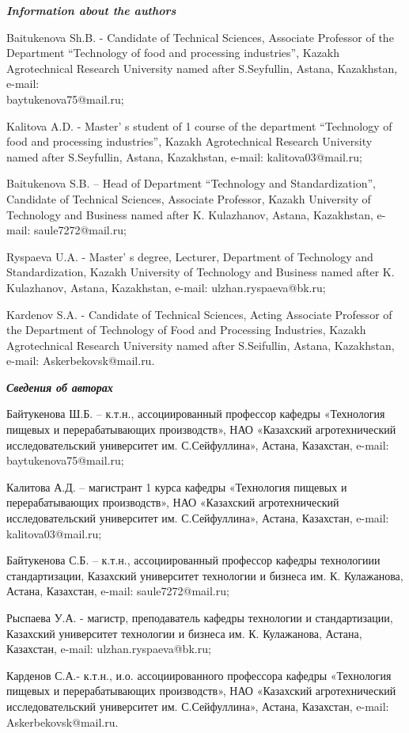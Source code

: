\begin{authorinfo}
\emph{{\bfseries Information about the authors}}

Baitukenova Sh.B. - Candidate of Technical Sciences, Associate Professor
of the Department ``Technology of food and process\-ing industries'',
Kazakh Agrotechnical Research University named after S.Seyfullin,
Astana, Kazakhstan, e-mail: \\baytukenova75@mail.ru;

Kalitova A.D. - Master' s student of 1 course of the
department ``Technology of food and processing industries'', Kazakh
Agrotechnical Research University named after S.Seyfullin, Astana,
Kazakhstan, e-mail: kalitova03@mail.ru;

Baitukenova S.B. -- Head of Department ``Technology and
Standardization'', Candidate of Technical Sciences, Associate Profes\-sor,
Kazakh University of Technology and Business named after K. Kulazhanov,
Astana, Kazakhstan, e-mail: saule7272@mail.ru;

Ryspaeva U.A. - Master' s degree, Lecturer, Department of
Technology and Standardization, Kazakh University of Technology and
Business named after K. Kulazhanov, Astana, Kazakhstan, e-mail:
ulzhan.ryspaeva@bk.ru;

Kardenov S.A. - Candidate of Technical Sciences, Acting Associate
Professor of the Department of Technology of Food and Processing
Industries, Kazakh Agrotechnical Research University named after
S.Seifullin, Astana, Kazakhstan, e-mail: Askerbekovsk@mail.ru.

\emph{{\bfseries Сведения об авторах}}

Байтукенова Ш.Б. -- к.т.н., ассоциированный профессор кафедры
«Технология пищевых и перерабатывающих производств», НАО «Казахский
агротехнический исследовательский университет им. С.Сейфуллина», Астана,
Казахстан, e-mail: baytukenova75@mail.ru;

Калитова А.Д. -- магистрант 1 курса кафедры «Технология пищевых и
перерабатывающих производств», НАО «Казахский агротехнический
исследовательский университет им. С.Сейфуллина», Астана, Казахстан,
e-mail: kalitova03@mail.ru;

Байтукенова С.Б. -- к.т.н., ассоциированный профессор кафедры
технологиии стандартизации, Казахский университет технологии и бизнеса
им. К. Кулажанова, Астана, Казахстан, e-mail: saule7272@mail.ru;

Рыспаева У.А. - магистр, преподаватель кафедры технологии и
стандартизации, Казахский университет технологии и бизнеса им. К.
Кулажанова, Астана, Казахстан, e-mail: ulzhan.ryspaeva@bk.ru;

Карденов С.А.- к.т.н., и.о. ассоциированного профессора кафедры
«Технология пищевых и перерабатывающих производств», НАО «Казахский
агротехнический исследовательский университет им. С.Сейфуллина»,
Астана, Казахстан, e-mail: Askerbekovsk@mail.ru.
\end{authorinfo}
